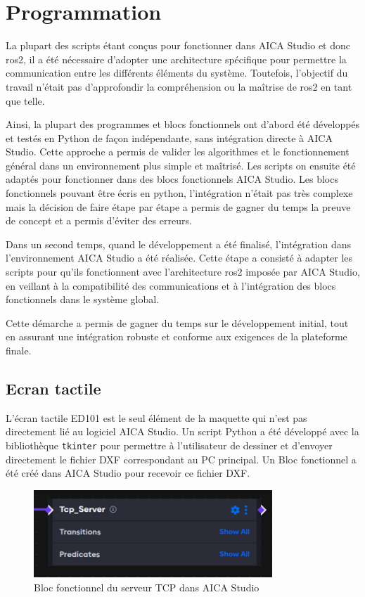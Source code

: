 \chapter{Programmation}
\label{chap:programmation}

La plupart des scripts étant conçus pour fonctionner dans AICA Studio et donc \gls{ros2}, il a été nécessaire d'adopter une architecture spécifique pour permettre la communication entre les différents éléments du système. Toutefois, l'objectif du travail n'était pas d'approfondir la compréhension ou la maîtrise de \gls{ros2} en tant que telle.

Ainsi, la plupart des programmes et blocs fonctionnels ont d'abord été développés et testés en Python de façon indépendante, sans intégration directe à AICA Studio. Cette approche a permis de valider les algorithmes et le fonctionnement général dans un environnement plus simple et maîtrisé. Les scripts on ensuite été adaptés pour fonctionner dans des blocs fonctionnels AICA Studio. Les blocs fonctionnels pouvant être écris en python, l'intégration n'était pas très complexe mais la décision de faire étape par étape a permis de gagner du temps la preuve de concept et a permis d'éviter des erreurs.

Dans un second temps, quand le développement a été finalisé, l'intégration dans l'environnement AICA Studio a été réalisée. Cette étape a consisté à adapter les scripts pour qu'ils fonctionnent avec l'architecture \gls{ros2} imposée par AICA Studio, en veillant à la compatibilité des communications et à l'intégration des blocs fonctionnels dans le système global.

Cette démarche a permis de gagner du temps sur le développement initial, tout en assurant une intégration robuste et conforme aux exigences de la plateforme finale.

\section{Ecran tactile}
L'écran tactile ED101 est le seul élément de la maquette qui n'est pas directement lié au logiciel AICA Studio. Un script Python a été développé avec la bibliothèque \texttt{tkinter} pour permettre à l'utilisateur de dessiner et d'envoyer directement le fichier DXF correspondant au PC principal. Un Bloc fonctionnel a été créé dans AICA Studio pour recevoir ce fichier DXF.

\begin{figure}[H]
    \centering
    \includegraphics[width=0.8\textwidth]{assets/figures/AICA_Tcp_Server.png}
    \caption{Bloc fonctionnel du serveur TCP dans AICA Studio}
    \label{fig:touchscreen_interface}
\end{figure}

